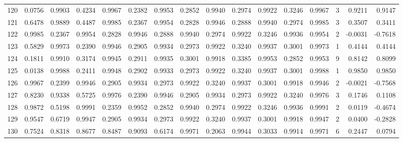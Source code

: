 \begin{tabular}{lrrrrrrrrrrrrrrr}
120 &      0.0756 &  0.9903 &  0.4234 &  0.9967 &  0.2382 &  0.9953 &  0.2852 &  0.9940 &  0.2974 &  0.9922 &   0.3246 &     0.9967 &      3 &                    0.9211 &                     0.9147 \\
121 &      0.6478 &  0.9889 &  0.4487 &  0.9985 &  0.2367 &  0.9954 &  0.2828 &  0.9946 &  0.2888 &  0.9940 &   0.2974 &     0.9985 &      3 &                    0.3507 &                     0.3411 \\
122 &      0.9985 &  0.2367 &  0.9954 &  0.2828 &  0.9946 &  0.2888 &  0.9940 &  0.2974 &  0.9922 &  0.3246 &   0.9936 &     0.9954 &      2 &                   -0.0031 &                    -0.7618 \\
123 &      0.5829 &  0.9973 &  0.2390 &  0.9946 &  0.2905 &  0.9934 &  0.2973 &  0.9922 &  0.3240 &  0.9937 &   0.3001 &     0.9973 &      1 &                    0.4144 &                     0.4144 \\
124 &      0.1811 &  0.9910 &  0.3174 &  0.9945 &  0.2911 &  0.9935 &  0.3001 &  0.9918 &  0.3385 &  0.9953 &   0.2852 &     0.9953 &      9 &                    0.8142 &                     0.8099 \\
125 &      0.0138 &  0.9988 &  0.2411 &  0.9948 &  0.2902 &  0.9933 &  0.2973 &  0.9922 &  0.3240 &  0.9937 &   0.3001 &     0.9988 &      1 &                    0.9850 &                     0.9850 \\
126 &      0.9967 &  0.2399 &  0.9946 &  0.2905 &  0.9934 &  0.2973 &  0.9922 &  0.3240 &  0.9937 &  0.3001 &   0.9918 &     0.9946 &      2 &                   -0.0021 &                    -0.7568 \\
127 &      0.8230 &  0.9338 &  0.5725 &  0.9976 &  0.2390 &  0.9946 &  0.2905 &  0.9934 &  0.2973 &  0.9922 &   0.3240 &     0.9976 &      3 &                    0.1746 &                     0.1108 \\
128 &      0.9872 &  0.5198 &  0.9991 &  0.2359 &  0.9952 &  0.2852 &  0.9940 &  0.2974 &  0.9922 &  0.3246 &   0.9936 &     0.9991 &      2 &                    0.0119 &                    -0.4674 \\
129 &      0.9547 &  0.6719 &  0.9947 &  0.2905 &  0.9934 &  0.2973 &  0.9922 &  0.3240 &  0.9937 &  0.3001 &   0.9918 &     0.9947 &      2 &                    0.0400 &                    -0.2828 \\
130 &      0.7524 &  0.8318 &  0.8677 &  0.8487 &  0.9093 &  0.6174 &  0.9971 &  0.2063 &  0.9944 &  0.3033 &   0.9914 &     0.9971 &      6 &                    0.2447 &                     0.0794 \\

\end{tabular}
